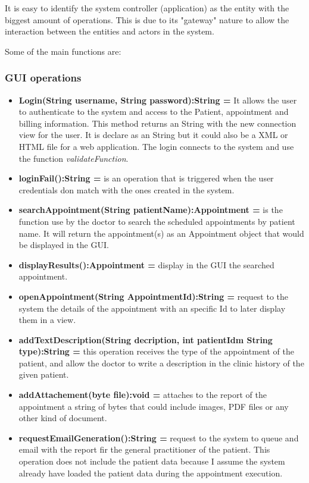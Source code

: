 \documentclass{article}
\begin{document}
            It is easy to identify the system controller (application) as the entity with the biggest amount of operations. This is due to its "gateway" nature to allow the  interaction between the entities and actors in the system.
            
            Some of the main functions are:

            \subsubsection{GUI operations}
            \begin{itemize}
                \item \textbf{Login(String username, String password):String =}  It allows the user to authenticate to the system and access to the Patient, appointment and billing information. This method returns an String with the new connection view for the user. It is declare as an
                String but it could also be a XML or HTML file for a web application. The login connects to the system and use the function \textit{validateFunction}.
                \item \textbf{loginFail():String =} is an operation that is triggered when the user credentials don match with the ones created in the system.
                \item \textbf{searchAppointment(String patientName):Appointment = } is the function use by the doctor to search the scheduled appointments by patient name. It will return the appointment(s) as an Appointment object that would be displayed in the GUI.
                \item \textbf{displayResults():Appointment = } display in the GUI the searched appointment.
                \item \textbf{openAppointment(String AppointmentId):String = }  request to the system the details of the appointment with an specific Id to later display them in a view.
                \item \textbf{addTextDescription(String decription, int patientIdm String type):String = } this operation receives the type of the appointment of the patient, and allow the doctor to write a description in the clinic history of the given patient.
                \item \textbf{addAttachement(byte file):void = } attaches to the report of the appointment  a string of bytes that could include images, PDF files or any other kind of document.
                \item \textbf{requestEmailGeneration():String = } request to the system to queue and email with the report fir the general practitioner of the patient. This operation does not include the patient data because I assume the system already have loaded the patient data during the appointment execution.

\end{itemize}
\end{document}
